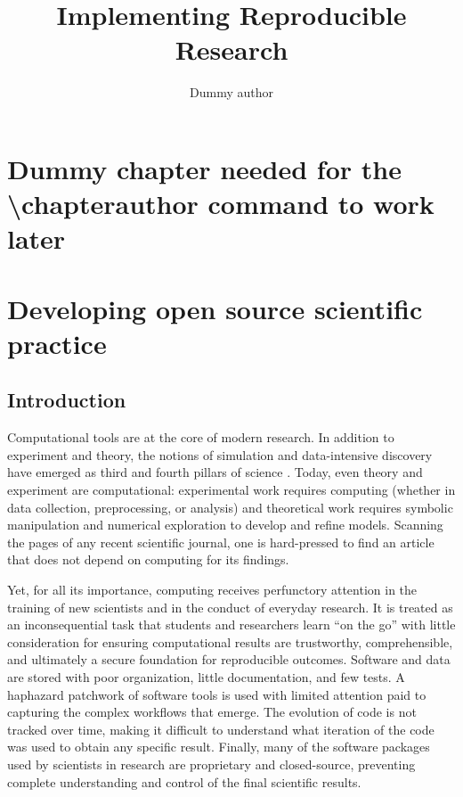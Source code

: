 \documentclass[ChapterTOCs,krantz2]{krantz} %
\begin{document}
\title{Implementing Reproducible Research}
\author{Dummy author}
\chapter*{Dummy chapter needed for the \textbackslash chapterauthor command to work later}

\mainmatter


\chapter{Developing open source scientific practice}


\section{Introduction}\label{intro}

Computational tools are at the core of modern research. In addition to
experiment and theory, the notions of simulation and data-intensive discovery
have emerged as third and fourth pillars of science \cite{4th-paradigm}.
Today, even theory and experiment are computational: experimental work requires
computing (whether in data collection, preprocessing, or analysis) and
theoretical work requires symbolic manipulation and numerical exploration to
develop and refine models. Scanning the pages of any recent scientific journal,
one is hard-pressed to find an article that does not depend on computing for
its findings.

Yet, for all its importance, computing receives perfunctory attention in the
training of new scientists and in the conduct of everyday research.  It is
treated as an inconsequential task that students and researchers learn ``on the
go'' with little consideration for ensuring computational results are
trustworthy, comprehensible, and ultimately a secure foundation for
reproducible outcomes.  Software and data are stored with poor organization,
little documentation, and few tests.  A haphazard patchwork of software tools
is used with limited attention paid to capturing the complex workflows that
emerge.  The evolution of code is not tracked over time, making it difficult to
understand what iteration of the code was used to obtain any specific result.
Finally, many of the software packages used by scientists in research are
proprietary and closed-source, preventing complete understanding and control of
the final scientific results.
\end{document}
